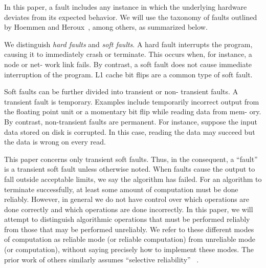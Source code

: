 In this paper, a fault includes any instance in which the underlying
hardware deviates from its expected behavior.
We will use the taxonomy of faults outlined by Hoemmen and Heroux~\cite{hoemmen2011reliability}, among others, as summarized below.

%
We distinguish \emph{hard faults} and \emph{soft faults}. A hard fault interrupts the program, causing it to immediately crash or terminate. This occurs when, for instance, a node or net- work link fails. By contrast, a soft fault does not cause immediate interruption of the program. L1 cache bit flips
are a common type of soft fault.

%
Soft faults can be further divided into transient or non-
transient faults. A transient fault is temporary. Examples include temporarily incorrect output from the floating point unit or a momentary bit flip while reading data from mem- ory. By contrast, non-transient faults are permanent. For instance, suppose the input data stored on disk is corrupted. In this case, reading the data may succeed but the data is wrong on every read.


%
This paper concerns only transient soft faults. Thus, in the consequent, a ``fault'' is a transient soft fault unless otherwise noted. When faults cause the output to fall outside acceptable limits, we say the algorithm has failed.
For an algorithm to terminate successfully, at least some amount of computation must be done reliably. However, in general we do not have control over which operations are done correctly and which operations are done incorrectly. In this paper, we will attempt to distinguish algorithmic operations that must be performed reliably from those that may be performed unreliably. We refer to these different modes of computation as reliable mode (or reliable computation) from unreliable mode (or computation), without saying precisely how to implement these modes. The prior work of others similarly assumes ``selective reliability'' ~\cite{hoemmen2011reliability}.